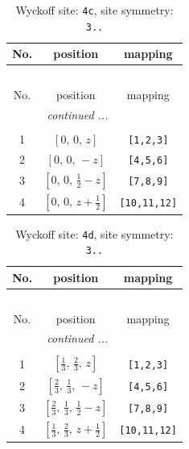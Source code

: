 \documentclass[fleqn,8pt]{jsarticle}
\begin{document}
\renewcommand{\arraystretch}{1.2}
\begin{longtable}{ccc}
\caption{Wyckoff site: {\tt 4c}, site symmetry: {\tt 3..}}
 \\
 \hline \hline
No. & position & mapping \\ \hline \endfirsthead

\multicolumn{2}{l}{\tablename\ \thetable{}} \\
 \hline \hline
No. & position & mapping \\ \hline \endhead

 \hline \hline
\multicolumn{2}{r}{\footnotesize\it continued ...} \\ \endfoot

 \hline \hline
\multicolumn{2}{r}{} \\ \endlastfoot

1 & $\left[ 0,\, 0,\, z \right]$ & {\tt [1,2,3]} \\ \hline
2 & $\left[ 0,\, 0,\, - z \right]$ & {\tt [4,5,6]} \\ \hline
3 & $\left[ 0,\, 0,\, \frac{1}{2} - z \right]$ & {\tt [7,8,9]} \\ \hline
4 & $\left[ 0,\, 0,\, z + \frac{1}{2} \right]$ & {\tt [10,11,12]} \\
\end{longtable}
\renewcommand{\arraystretch}{1.2}
\begin{longtable}{ccc}
\caption{Wyckoff site: {\tt 4d}, site symmetry: {\tt 3..}}
 \\
 \hline \hline
No. & position & mapping \\ \hline \endfirsthead

\multicolumn{2}{l}{\tablename\ \thetable{}} \\
 \hline \hline
No. & position & mapping \\ \hline \endhead

 \hline \hline
\multicolumn{2}{r}{\footnotesize\it continued ...} \\ \endfoot

 \hline \hline
\multicolumn{2}{r}{} \\ \endlastfoot

1 & $\left[ \frac{1}{3},\, \frac{2}{3},\, z \right]$ & {\tt [1,2,3]} \\ \hline
2 & $\left[ \frac{2}{3},\, \frac{1}{3},\, - z \right]$ & {\tt [4,5,6]} \\ \hline
3 & $\left[ \frac{2}{3},\, \frac{1}{3},\, \frac{1}{2} - z \right]$ & {\tt [7,8,9]} \\ \hline
4 & $\left[ \frac{1}{3},\, \frac{2}{3},\, z + \frac{1}{2} \right]$ & {\tt [10,11,12]} \\
\end{longtable}
\end{document}
